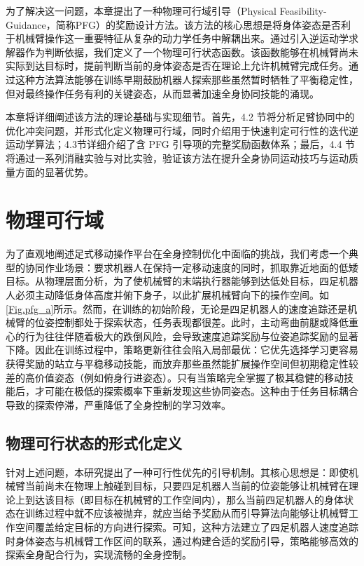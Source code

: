 为了解决这一问题，本章提出了一种物理可行域引导（Physical Feasibility-Guidance，简称PFG）的奖励设计方法。该方法的核心思想是将身体姿态是否利于机械臂操作这一重要特征从复杂的动力学任务中解耦出来。通过引入逆运动学求解器作为判断依据，我们定义了一个物理可行状态函数。该函数能够在机械臂尚未实际到达目标时，提前判断当前的身体姿态是否在理论上允许机械臂完成任务。通过这种方法算法能够在训练早期鼓励机器人探索那些虽然暂时牺牲了平衡稳定性，但对最终操作任务有利的关键姿态，从而显著加速全身协同技能的涌现。

本章将详细阐述该方法的理论基础与实现细节。首先，4.2 节将分析足臂协同中的优化冲突问题，并形式化定义物理可行域，同时介绍用于快速判定可行性的迭代逆运动学算法；4.3节详细介绍了含 PFG 引导项的完整奖励函数体系；最后，4.4 节将通过一系列消融实验与对比实验，验证该方法在提升全身协同运动技巧与运动质量方面的显著优势。
\section{物理可行域}

为了直观地阐述足式移动操作平台在全身控制优化中面临的挑战，我们考虑一个典型的协同作业场景：要求机器人在保持一定移动速度的同时，抓取靠近地面的低矮目标。从物理层面分析，为了使机械臂的末端执行器能够到达低处目标，四足机器人必须主动降低身体高度并俯下身子，以此扩展机械臂向下的操作空间。如\autoref{Fig.pfg_a}所示。然而，在训练的初始阶段，无论是四足机器人的速度追踪还是机械臂的位姿控制都处于探索状态，任务表现都很差。此时，主动弯曲前腿或降低重心的行为往往伴随着极大的跌倒风险，会导致速度追踪奖励与位姿追踪奖励的显著下降。因此在训练过程中，策略更新往往会陷入局部最优：它优先选择学习更容易获得奖励的站立与平稳移动技能，而放弃那些虽然能扩展操作空间但初期稳定性较差的高价值姿态（例如俯身行进姿态）。只有当策略完全掌握了极其稳健的移动技能后，才可能在极低的探索概率下重新发现这些协同姿态。这种由于任务目标耦合导致的探索停滞，严重降低了全身控制的学习效率。

\subsection{物理可行状态的形式化定义}
针对上述问题，本研究提出了一种可行性优先的引导机制。其核心思想是：即使机械臂当前尚未在物理上触碰到目标，只要四足机器人当前的位姿能够让机械臂在理论上到达该目标（即目标在机械臂的工作空间内），那么当前四足机器人的身体状态在训练过程中就不应该被抛弃，就应当给予奖励从而引导算法向能够让机械臂工作空间覆盖给定目标的方向进行探索。可知，这种方法建立了四足机器人速度追踪时身体姿态与机械臂工作区间的联系，通过构建合适的奖励引导，策略能够高效的探索全身配合行为，实现流畅的全身控制。

